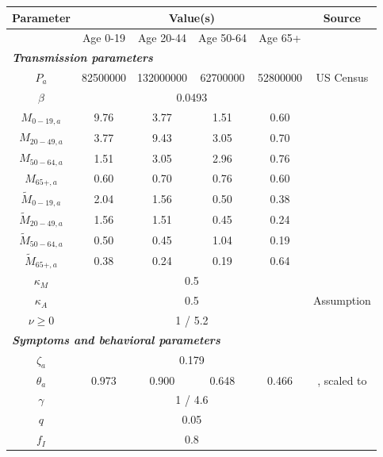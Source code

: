 \documentclass{article}
\begin{document}
\begin{table}
\begin{center}
\begin{tabular}{|c|cccc|c|}
\hline
Parameter & \multicolumn{4}{|c|}{Value(s)} & Source \\
\hline
 & Age 0-19 & Age 20-44 & Age 50-64 & Age 65+ & \\
\hline
\multicolumn{6}{|l|}{\textbf{\emph{Transmission parameters}}} \\
\hline
$P_a$ & 82500000 & 132000000 & 62700000 & 52800000 & US Census \\
$\beta$ & \multicolumn{4}{|c|}{0.0493} & \citet{moghadasCOVID} \\
$M_{0-19,a}$ & 9.76 & 3.77 & 1.51 & 0.60 & \citet{moghadasCOVID} \\
$M_{20-49,a}$ & 3.77 & 9.43 & 3.05 & 0.70 & \citet{moghadasCOVID} \\
$M_{50-64,a}$ & 1.51 & 3.05 & 2.96 & 0.76 & \citet{moghadasCOVID} \\
$M_{65+,a}$ & 0.60 & 0.70 & 0.76 & 0.60 & \citet{moghadasCOVID} \\
$\tilde{M}_{0-19,a}$ & 2.04 & 1.56 & 0.50 & 0.38 & \citet{moghadasCOVID} \\
$\tilde{M}_{20-49,a}$ & 1.56 & 1.51 & 0.45 & 0.24 & \citet{moghadasCOVID} \\
$\tilde{M}_{50-64,a}$ & 0.50 & 0.45 & 1.04 & 0.19 & \citet{moghadasCOVID} \\
$\tilde{M}_{65+,a}$ & 0.38 & 0.24 & 0.19 & 0.64 & \citet{moghadasCOVID} \\
$\kappa_M$ & \multicolumn{4}{|c|}{0.5} & \citet{moghadasCOVID} \\
$\kappa_A$ & \multicolumn{4}{|c|}{0.5} & Assumption \\
$\nu \ge 0$ & \multicolumn{4}{|c|}{1 / 5.2} & \citet{moghadasCOVID} \\
\hline
\multicolumn{6}{|l|}{\textbf{\emph{Symptoms and behavioral parameters}}} \\
\hline
$\zeta_a$ & \multicolumn{4}{|c|}{0.179} & \citet{Mizumoto:2020} \\
$\theta_a$ & 0.973 & 0.900 & 0.648 & 0.466 & \citet{WHO:COVID:2020}, scaled to \citet{moghadasCOVID} \\
$\gamma$ & \multicolumn{4}{|c|}{1 / 4.6} & \citet{moghadasCOVID} \\
$q$ & \multicolumn{4}{|c|}{0.05} & \citet{moghadasCOVID} \\
$f_I$ & \multicolumn{4}{|c|}{0.8} & \citet{moghadasCOVID} \\

\end{tabular}
\end{center}
\end{table}
\end{document}
